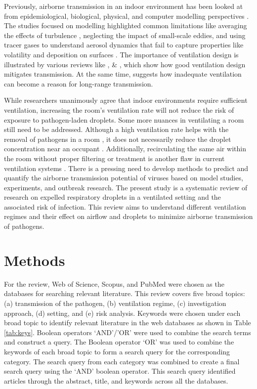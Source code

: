 \documentclass[a4paper,12pt]{elsarticle}
\begin{document}
Previously, airborne transmission in an indoor environment has been looked at from epidemiological, biological, physical, and computer modelling perspectives \cite{argyropoulos2023airborne}. The studies focused on modelling highlighted common limitations like averaging the effects of turbulence \cite{mirzaie2021covid,dbouk2020respiratory}, neglecting the impact of small-scale eddies, and using tracer gases to understand aerosol dynamics that fail to capture properties like volatility and deposition on surfaces \cite{rayegan2022review, zhao2022airborne}. The importance of ventilation design is illustrated by various reviews like \cite{luongo2016role}, \cite{hobeika2023assessing} \& \cite{thornton2022impact}, which show how good ventilation design mitigates transmission. At the same time, \citet{correia2020airborne} suggests how inadequate ventilation can become a reason for long-range transmission.

While researchers unanimously agree that indoor environments require sufficient ventilation, increasing the room's ventilation rate will not reduce the risk of exposure to pathogen-laden droplets. Some more nuances in ventilating a room still need to be addressed. Although a high ventilation rate helps with the removal of pathogens in a room \cite{guo2022visualization, ho2021modeling}, it does not necessarily reduce the droplet concentration near an occupant \cite{arpino2023cfd}. Additionally, recirculating the same air within the room without proper filtering or treatment is another flaw in current ventilation systems \cite{li2021probable}. There is a pressing need to develop methods to predict and quantify the airborne transmission potential of viruses based on model studies, experiments, and outbreak research. The present study is a systematic review of research on expelled respiratory droplets in a ventilated setting and the associated risk of infection. This review aims to understand different ventilation regimes and their effect on airflow and droplets to minimize airborne transmission of pathogens.

\section{Methods}

For the review, Web of Science, Scopus, and PubMed were chosen as the databases for searching relevant literature. This review covers five broad topics: (a) transmission of the pathogen, (b) ventilation regime, (c) investigation approach, (d) setting, and (e) risk analysis. Keywords were chosen under each broad topic to identify relevant literature in the web databases as shown in Table \ref{tab:keys}. Boolean operators `AND'/'OR' were used to combine the search terms and construct a query. The Boolean operator `OR' was used to combine the keywords of each broad topic to form a search query for the corresponding category. The search query from each category was combined to create a final search query using the `AND' boolean operator. This search query identified articles through the abstract, title, and keywords across all the databases.
\end{document}
